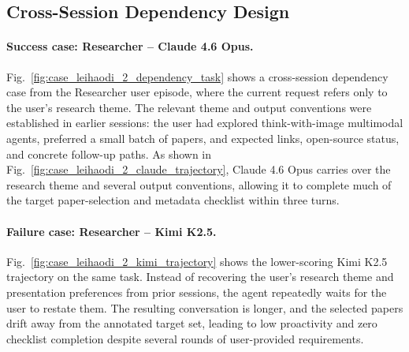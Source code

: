\subsection{Cross-Session Dependency Design}
\paragraph{Success case: Researcher -- Claude 4.6 Opus.}
Fig.~\ref{fig:case_leihaodi_2_dependency_task} shows a cross-session dependency case from the Researcher user episode, where the current request refers only to the user's research theme.
The relevant theme and output conventions were established in earlier sessions: the user had explored think-with-image multimodal agents, preferred a small batch of papers, and expected links, open-source status, and concrete follow-up paths.
As shown in Fig.~\ref{fig:case_leihaodi_2_claude_trajectory}, Claude 4.6 Opus carries over the research theme and several output conventions, allowing it to complete much of the target paper-selection and metadata checklist within three turns.

\paragraph{Failure case: Researcher -- Kimi K2.5.}
Fig.~\ref{fig:case_leihaodi_2_kimi_trajectory} shows the lower-scoring Kimi K2.5 trajectory on the same task.
Instead of recovering the user's research theme and presentation preferences from prior sessions, the agent repeatedly waits for the user to restate them.
The resulting conversation is longer, and the selected papers drift away from the annotated target set, leading to low proactivity and zero checklist completion despite several rounds of user-provided requirements.



